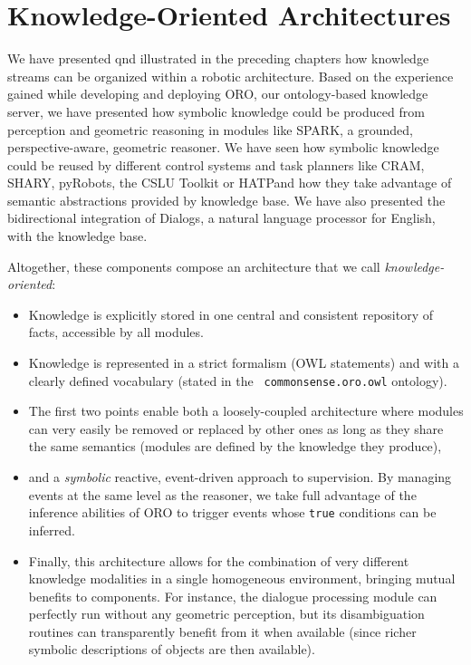 \section{Knowledge-Oriented Architectures}


We have presented qnd illustrated in the preceding chapters how knowledge
streams can be organized within a robotic architecture. Based on the experience
gained while developing and deploying {\sc ORO}, our ontology-based knowledge
server, we have presented how symbolic knowledge could be produced from
perception and geometric reasoning in modules like {\sc SPARK}, a grounded,
perspective-aware, geometric reasoner. We have seen how symbolic knowledge
could be reused by different control systems and task planners like {\sc CRAM},
{\sc SHARY}, {\sc pyRobots}, the {\sc CSLU Toolkit} or {\sc HATP}and how they
take advantage of semantic abstractions provided by knowledge base. We have
also presented the bidirectional integration of {\sc Dialogs}, a natural
language processor for English, with the knowledge base.

Altogether, these components compose an architecture that we call
\emph{knowledge-oriented}:

\begin{itemize}
    
    \item{Knowledge is explicitly stored in one central and consistent
    repository of facts, accessible by all modules.} 

    \item{Knowledge is represented in a strict formalism (OWL statements) and
    with a clearly defined vocabulary (stated in the {\tt
    commonsense.oro.owl} ontology).} 

    \item{The first two points enable both a loosely-coupled architecture where
    modules can very easily be removed or replaced by other ones as long as
    they share the same semantics (modules are defined by the knowledge they
    produce),} 

    \item{and a \emph{symbolic} reactive, event-driven approach to supervision.
    By managing events at the same level as the reasoner, we take full
    advantage of the inference abilities of ORO to trigger events whose
    \texttt{true} conditions can be inferred.} 

    \item{Finally, this architecture allows for the combination of very
    different knowledge modalities in a single homogeneous environment,
    bringing mutual benefits to components. For instance, the dialogue
    processing module can perfectly run without any geometric
    perception, but its disambiguation routines can transparently
    benefit from it when available (since richer symbolic descriptions of
    objects are then available).}

\end{itemize}


